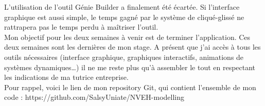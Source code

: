 \documentclass[a4paper, french, 12pt, titlepage]{article}
\begin{document}
L'utilisation de l'outil Génie Builder a finalement été écartée. Si l'interface graphique est aussi simple, le temps gagné par le système de cliqué-glissé ne rattrapera pas le temps perdu à maîtriser l'outil. \\

Mon objectif pour les deux semaines à venir est de terminer l'application. Ces deux semaines sont les dernières de mon stage. A présent que j'ai accès à tous les outils nécessaires (interface graphique, graphiques interactifs, animations de systèmes dynamiques…) il ne me reste plus qu'à assembler le tout en respectant les indications de ma tutrice entreprise.\\

Pour rappel, voici le lien de mon repository Git, qui contient l'ensemble de mon code : https://github.com/SalsyUniate/NVEH-modelling
\end{document}
